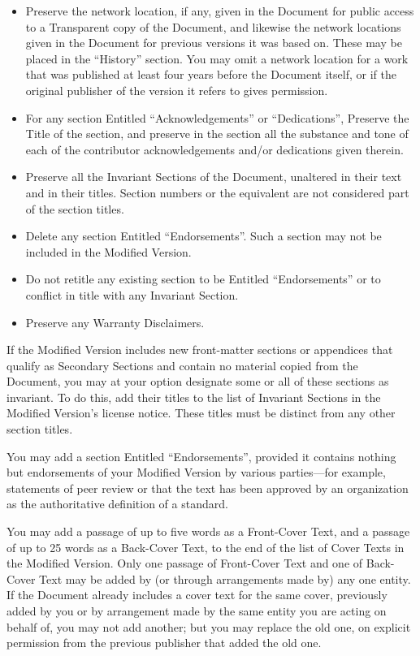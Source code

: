 \documentclass[a4paper,11pt,oneside]{book}
\begin{document}
\begin{itemize}
	\item[J.]
	Preserve the network location, if any, given in the Document for
	public access to a Transparent copy of the Document, and likewise
	the network locations given in the Document for previous versions
	it was based on.  These may be placed in the ``History'' section.
	You may omit a network location for a work that was published at
	least four years before the Document itself, or if the original
	publisher of the version it refers to gives permission.

	\item[K.]
	For any section Entitled ``Acknowledgements'' or ``Dedications'',
	Preserve the Title of the section, and preserve in the section all
	the substance and tone of each of the contributor acknowledgements
	and/or dedications given therein.

	\item[L.]
	Preserve all the Invariant Sections of the Document,
	unaltered in their text and in their titles.  Section numbers
	or the equivalent are not considered part of the section titles.

	\item[M.]
	Delete any section Entitled ``Endorsements''.  Such a section
	may not be included in the Modified Version.

	\item[N.]
	Do not retitle any existing section to be Entitled ``Endorsements''
	or to conflict in title with any Invariant Section.

	\item[O.]
	Preserve any Warranty Disclaimers.
\end{itemize}

If the Modified Version includes new front-matter sections or
appendices that qualify as Secondary Sections and contain no material
copied from the Document, you may at your option designate some or all
of these sections as invariant.  To do this, add their titles to the
list of Invariant Sections in the Modified Version's license notice.
These titles must be distinct from any other section titles.

You may add a section Entitled ``Endorsements'', provided it contains
nothing but endorsements of your Modified Version by various
parties---for example, statements of peer review or that the text has
been approved by an organization as the authoritative definition of a
standard.

You may add a passage of up to five words as a Front-Cover Text, and a
passage of up to 25 words as a Back-Cover Text, to the end of the list
of Cover Texts in the Modified Version.  Only one passage of
Front-Cover Text and one of Back-Cover Text may be added by (or
through arrangements made by) any one entity.  If the Document already
includes a cover text for the same cover, previously added by you or
by arrangement made by the same entity you are acting on behalf of,
you may not add another; but you may replace the old one, on explicit
permission from the previous publisher that added the old one.
\end{document}
